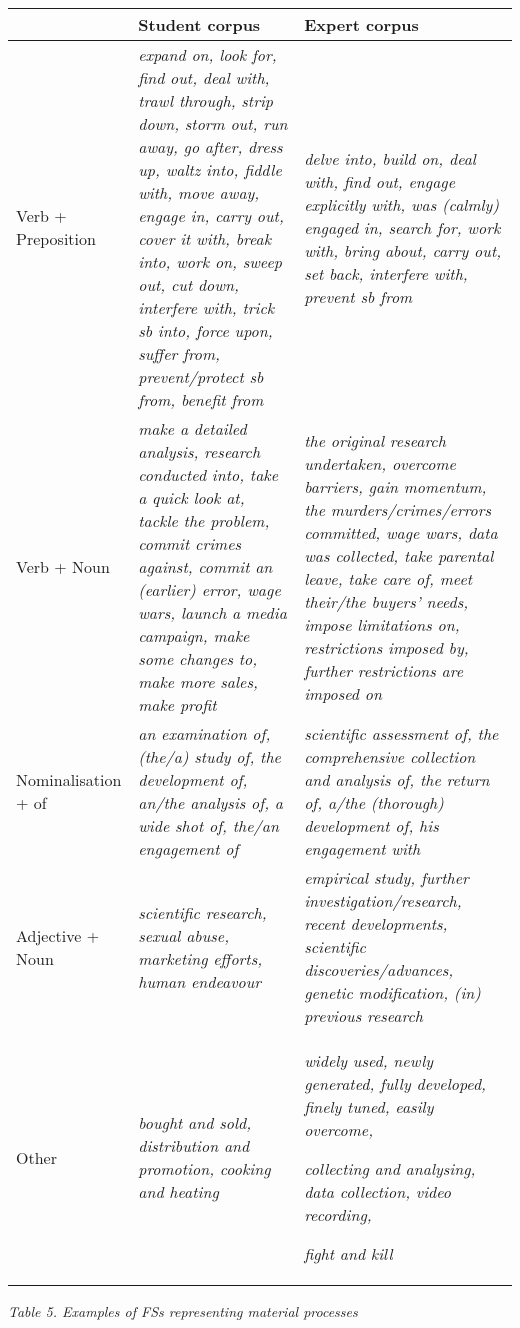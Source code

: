 \begin{center}
\tablefirsthead{}
\tablehead{}
\tabletail{}
\tablelasttail{}
\begin{supertabular}{m{1.1587598in}m{1.7205598in}m{1.6045599in}}
\hline
 &
Student corpus &
Expert corpus\\\hline
Verb + Preposition &
\textit{expand on, look for, find out, deal with, trawl through, strip down, storm out, run away, go after, dress up, waltz into, fiddle with, move away, engage in, carry out, cover it with, break into, work on, sweep out, cut down, interfere with, trick sb into, force upon, suffer from, prevent/protect sb from, benefit from} &
\textit{delve into, build on, deal with, find out, engage explicitly with, was (calmly) engaged in, search for, work with, bring about, carry out, set back, interfere with, prevent sb from}\\\hline
Verb + Noun &
\textit{make a detailed analysis, research conducted into, take a quick look at, tackle the problem, commit crimes against, commit an (earlier) error, wage wars, launch a media campaign, make some changes to, make more sales, make profit} &
\textit{the original research undertaken, overcome barriers, gain momentum, the murders/crimes/errors committed, wage wars, data was collected, take parental leave, take care of, meet their/the buyers’ needs, impose limitations on, restrictions imposed by, further restrictions are imposed on}\\\hline
Nominalisation + of &
\textit{an examination of, (the/a) study of, the development of, an/the analysis of, a wide shot of, the/an engagement of} &
\textit{scientific assessment of, the comprehensive collection and analysis of, the return of, a/the (thorough) development of, his engagement with}\\\hline
Adjective + Noun &
\textit{scientific research, sexual abuse, marketing efforts, human endeavour} &
\textit{empirical study, further investigation/research, recent developments, scientific discoveries/advances, genetic modification, (in) previous research}\\\hline
Other &
\textit{bought and sold, distribution and promotion, cooking and heating} &
\textit{widely used, newly generated, fully developed, finely tuned, easily overcome,}

\textit{collecting and analysing, data collection, video recording, }

\textit{fight and kill}\\\hline
\end{supertabular}
\end{center}
\begin{styleStandard}
\textit{Table 5. Examples of FSs representing material processes}
\end{styleStandard}


